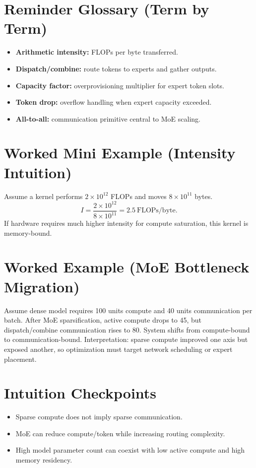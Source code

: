\section*{Reminder Glossary (Term by Term)}
\begin{itemize}[leftmargin=1.5em]
  \item \textbf{Arithmetic intensity:} FLOPs per byte transferred.
  \item \textbf{Dispatch/combine:} route tokens to experts and gather outputs.
  \item \textbf{Capacity factor:} overprovisioning multiplier for expert token slots.
  \item \textbf{Token drop:} overflow handling when expert capacity exceeded.
  \item \textbf{All-to-all:} communication primitive central to MoE scaling.
\end{itemize}

\section*{Worked Mini Example (Intensity Intuition)}
Assume a kernel performs $2\times10^{12}$ FLOPs and moves $8\times10^{11}$ bytes.
\[
I=\frac{2\times10^{12}}{8\times10^{11}}=2.5\ \text{FLOPs/byte}.
\]
If hardware requires much higher intensity for compute saturation, this kernel is memory-bound.

\section*{Worked Example (MoE Bottleneck Migration)}
Assume dense model requires 100 units compute and 40 units communication per batch.  
After MoE sparsification, active compute drops to 45, but dispatch/combine communication rises to 80.  
System shifts from compute-bound to communication-bound.  
Interpretation: sparse compute improved one axis but exposed another, so optimization must target network scheduling or expert placement.

\section*{Intuition Checkpoints}
\begin{itemize}[leftmargin=1.5em]
  \item Sparse compute does not imply sparse communication.
  \item MoE can reduce compute/token while increasing routing complexity.
  \item High model parameter count can coexist with low active compute and high memory residency.
\end{itemize}

